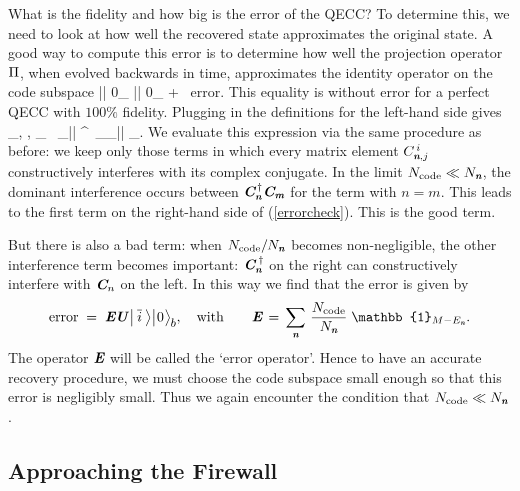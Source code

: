 \documentclass[12pt]{article}%
\def\spc{\hspace{.5pt}}
\def\be{\begin{equation}}
\def\ee{\end{equation}}
\begin{document}
What is the fidelity and how big is the error of the QECC? To determine
this, we need to look at how well the recovered state approximates the original state.
A good way to compute this error is to determine how well the projection operator $\mbox{\textit{\textbf{$\Pi$}\!\,}}$, when evolved backwards in time, approximates the
identity operator on the code subspace
\bea
\label{errorcheck}
\Pi  \spc \uU \bigl|\spc \ibar  \spc \ra  \bigl| \spc 0\spc \ra_{\nspc \bbbb} \is \uU \bigl|\spc \ibar  \spc \ra  \bigl| \spc 0\spc \ra_{\nspc \bbbb} \; + \ \mbox{error}. %
\eea
This equality is without error for a perfect QECC with $100\%$ fidelity. Plugging in the definitions for the left-hand side gives
\bea
\sum_{\kbar, \nom,\mom}
  {\pp_\nom} \, \cC_\nom\spc  \bigl|\spc \kbar\spc \ra \la\spc \kbar\spc \bigl|  \cC^{\, \dag}_\nom \cC_\mom\smpc \bigl|\smpc \ibar \smpc \ra  \bigl| \spc \mom \spc \ra_{\nspc \bbbb}. 
\eea
We evaluate this expression via the same procedure as before: we keep only those terms in which every matrix element $C_{{ \textit{\textbf n}}, j}^{\, i}$ 
constructively interferes with its complex conjugate. In the limit ${N_{\rm code}}\ll N_{ \textit{\textbf n}}$,  the dominant interference
occurs between $\mbox{\textit{\textbf{C}\!\,}}^{\, \dag}_{ \textit{\textbf n}} \mbox{\textit{\textbf{C}\!\,}}_{ \textit{\textbf m}}$ for the term with $n=m$. This leads to the
first term on the right-hand side of (\ref{errorcheck}). This is the good term. 

\def\hH{\textit{\textbf H}} 
But there is also a bad term: when ${N_{\rm code}}/N_{ \textit{\textbf n}} $ becomes non-negligible, the other
interference term becomes important: $\mbox{\textit{\textbf{C}\!\,}}_{ \textit{\textbf n}}^{\; \dag}$ on the right can constructively interfere with $\mbox{\textit{\textbf{C}\!\,}}_n$ on the left. 
In this way we find that the error is given by
\be
\label{errorc}
\mbox{error}\; =\;  \Error \uU \bigl|\spc \ibar  \spc \ra  \bigl| \spc 0\spc \ra_{\nspc \bbbb},\quad\mbox{with}\qquad \Error\,=\,\sum_\nom\, \frac{{N_{\rm code}}}{N_\nom}\; \mathbb{1}_{M-E_\nom}.
\ee
The operator $\mbox{\textit{\textbf{E}\!\,}}$ will be called the `error operator'. 
Hence to have an accurate recovery procedure, we must choose the code subspace small enough so that this error is negligibly small.
Thus we again encounter the condition that ${N_{\rm code}} \ll N_{ \textit{\textbf n}}$.

\newpage

\subsection{Approaching the Firewall}
\end{document}
